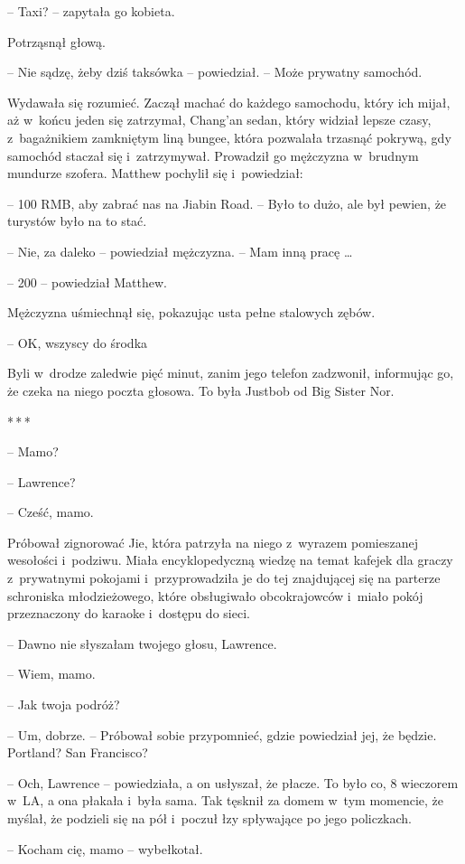 \documentclass[oneside,polish,11pt,rmheadings]{mwbk}
\newcommand{\threeast}{\par\centerline{*\,*\,*}\medskip\par}
\begin{document}
-- Taxi? -- zapytała go kobieta.

Potrząsnął głową. 

-- Nie sądzę, żeby dziś taksówka -- powiedział. -- Może prywatny samochód.

Wydawała się rozumieć. Zaczął machać do każdego samochodu, który ich mijał, aż w~końcu jeden się zatrzymał, Chang'an sedan, który widział lepsze czasy, z~bagażnikiem zamkniętym liną bungee, która pozwalała trzasnąć pokrywą, gdy samochód staczał się i~zatrzymywał. Prowadził go mężczyzna w~brudnym mundurze szofera. Matthew pochylił się i~powiedział: 

-- 100 RMB, aby zabrać nas na Jiabin Road. -- Było to dużo, ale był pewien, że turystów było na to stać.

-- Nie, za daleko -- powiedział mężczyzna. -- Mam inną pracę \ldots  

-- 200 -- powiedział Matthew.

Mężczyzna uśmiechnął się, pokazując usta pełne stalowych zębów.

-- OK, wszyscy do środka

Byli w~drodze zaledwie pięć minut, zanim jego telefon zadzwonił, informując go, że czeka na niego poczta głosowa. To była Justbob od Big Sister Nor.

\bigskip
\threeast

-- Mamo? 

-- Lawrence?

-- Cześć, mamo. 

 Próbował zignorować Jie, która patrzyła na niego z~wyrazem pomieszanej wesołości i~podziwu. Miała encyklopedyczną wiedzę na temat kafejek dla graczy z~prywatnymi pokojami i~przyprowadziła je do tej znajdującej się na parterze schroniska młodzieżowego, które obsługiwało obcokrajowców i~miało pokój przeznaczony do karaoke i~dostępu do sieci.

-- Dawno nie słyszałam twojego głosu, Lawrence. 

-- Wiem, mamo.

-- Jak twoja podróż? 

-- Um, dobrze. -- Próbował sobie przypomnieć, gdzie powiedział jej, że będzie. Portland? San Francisco?

-- Och, Lawrence -- powiedziała, a on usłyszał, że płacze. To było co, 8 wieczorem w~LA, a ona płakała i~była sama. Tak tęsknił za domem w~tym momencie, że myślał, że podzieli się na pół i~poczuł łzy spływające po jego policzkach.

-- Kocham cię, mamo -- wybełkotał.
\end{document}
